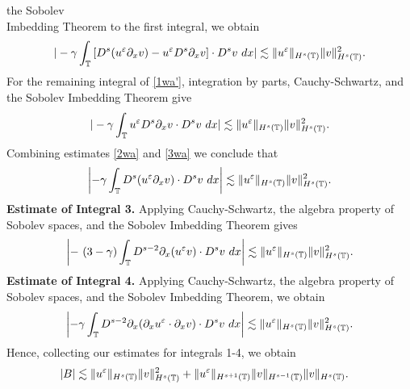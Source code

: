 the Sobolev \\ Imbedding Theorem to 
the first integral, we obtain
%
%
%
%
\begin{equation}
\begin{split}
| -\gamma \int_{\mathbb{T}} \left[ D^s(u^\varepsilon \partial_x v) - u^\varepsilon D^s
\partial_x v \right] \cdot D^s v \ dx |
\lesssim \|u^\varepsilon \|_{H^s(\mathbb{T})} \|v\|_{H^s(\mathbb{T})}^2.
\label{2wa}
\end{split}
\end{equation}
%
%
For the remaining integral of \eqref{1wa'}, integration by parts, 
Cauchy-Schwartz, and the Sobolev Imbedding Theorem give
%
%
\begin{equation}
\begin{split}
| - \gamma \int_{\mathbb{T}} u^\varepsilon D^s \partial_x v \cdot D^s v \ dx |
\lesssim \|u^\varepsilon \|_{H^s(\mathbb{T})} \|v\|_{H^s(\mathbb{T})}^2.
\label{3wa}
\end{split}
\end{equation}
%
%
Combining estimates \eqref{2wa} and \eqref{3wa} we conclude that
%
%
\begin{equation}
\begin{split}
\left | -\gamma \int_{\mathbb{T}} D^s (u^\varepsilon \partial_x v) \cdot D^s v \
dx \right |
 \lesssim \|u^\varepsilon \|_{H^s(\mathbb{T})} \|v\|_{H^s(\mathbb{T})}^2.
\label{4wa}
\end{split}
\end{equation}
%
%
\textbf{Estimate of Integral 3.} Applying Cauchy-Schwartz, the 
algebra property of Sobolev spaces, and the Sobolev Imbedding Theorem gives
%
%
\begin{equation}
\begin{split}
\left |- \ ( 3- \gamma) \int_{\mathbb{T}} D^{s-2} \partial_x (u^\varepsilon v) \cdot D^s
v \ dx \right |  \lesssim \|u^\varepsilon\|_{H^{s}(\mathbb{T})} \|v\|_{H^{s}(\mathbb{T})}^2.
\label{13u}
\end{split}
\end{equation}
%
%
%
%
%
%
\textbf{Estimate of Integral 4.} Applying Cauchy-Schwartz, the 
algebra property of Sobolev spaces, and the Sobolev Imbedding Theorem, we 
obtain
%
%
\begin{equation*}
\begin{split}
\left |-\gamma \int_{\mathbb{T}} D^{s-2} \partial_x
(\partial_x u^\varepsilon \cdot \partial_x v) \cdot D^s v \
dx \right |
 \lesssim \|u^\varepsilon\|_{H^s(\mathbb{T})} \|v\|_{H^s(\mathbb{T})}^2.
\end{split}
\end{equation*}
%
%
Hence, collecting our estimates for integrals 1-4, we obtain 
%
%
\begin{equation}
\begin{split}
|B| & \lesssim
\|u^\varepsilon\|_{H^s(\mathbb{T})}
\|v\|_{H^s(\mathbb{T})}^2 + \|u^\varepsilon\|_{H^{s+1}(\mathbb{T})}
\|v\|_{H^{s-1}(\mathbb{T})} \|v\|_{H^s(\mathbb{T})}.
\label{14u}
\end{split}
\end{equation}
